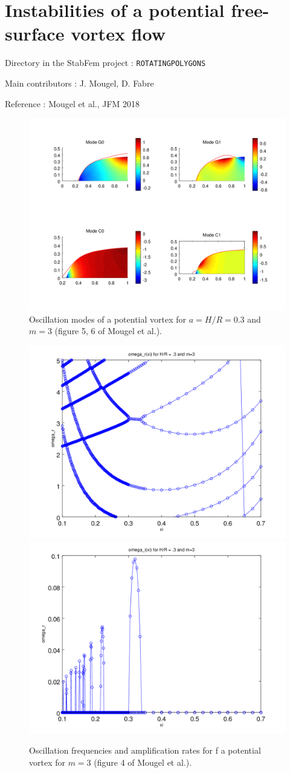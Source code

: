 
\chapter{Instabilities of a potential free-surface vortex flow}

\begin{description}
\item{Directory in the StabFem project :}  \texttt{ROTATINGPOLYGONS}
\item{Main contributors :} J. Mougel, D. Fabre
\item{Reference :} Mougel et al., JFM 2018 
\end{description}

\begin{figure}
\includegraphics[width=.8\linewidth]{../../CASES_STABLE/ROTATING_POLYGONS/FIGURES/POLYGONS_modes.png}
\caption{Oscillation modes of a potential vortex for  $a=H/R=0.3$ and $m=3$ (figure 5, 6 of Mougel et al.).}
\label{Bridges_NV_Eigenmodes_phi_cyl_L3_5}
\end{figure}

\begin{figure}
\includegraphics[width=.45\linewidth]{../../CASES_STABLE/ROTATING_POLYGONS/FIGURES/POLYGONS_omega.png}
\includegraphics[width=.45\linewidth]{../../CASES_STABLE/ROTATING_POLYGONS/FIGURES/POLYGONS_sigma.png}
\caption{Oscillation frequencies and amplification rates for f a potential vortex for $m=3$ (figure 4 of Mougel et al.).}
\label{Bridges_NV_Eigenmodes_phi_cyl_L3_5}
\end{figure}
 